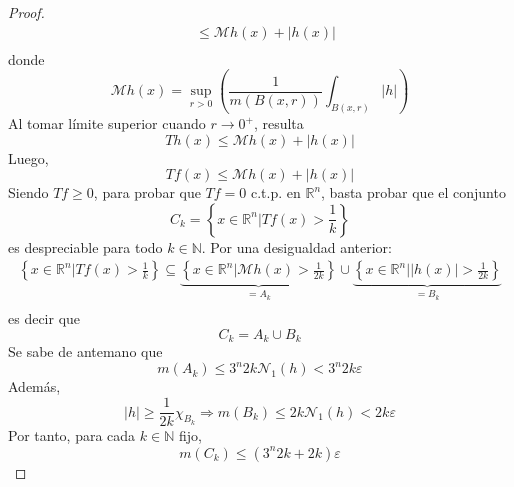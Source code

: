 \documentclass[12pt]{report}
\newcounter{it}
\theoremstyle{largebreak}
\renewcommand{\leq}{\ensuremath{\leqslant}}
\renewcommand{\geq}{\ensuremath{\geqslant}}
\newcommand\abs[1]{\ensuremath{\left|#1\right|}}
\newcommand{\N}[2]{\ensuremath{\mathcal{N}_{#1}\left(#2\right)}}
\begin{document}
\begin{proof}
\begin{equation*}
\begin{split}
                &\leq\mathcal{M}h(x)+\abs{h(x)}\\
            \end{split}
        \end{equation*}
        donde
        \begin{equation*}
            \mathcal{M}h(x)=\sup_{ r>0}\left(\frac{1}{m(B(x,r))}\int_{B(x,r)}\abs{h}\right)
        \end{equation*}
        Al tomar límite superior cuando $r\rightarrow0^+$, resulta
        \begin{equation*}
            Th(x)\leq\mathcal{M}h(x)+\abs{h(x)}
        \end{equation*}
        Luego,
        \begin{equation*}
            Tf(x)\leq\mathcal{M}h(x)+\abs{h(x)}
        \end{equation*}
        Siendo $Tf\geq0$, para probar que $Tf=0$ c.t.p. en $\mathbb{R}^n$, basta probar que el conjunto
        \begin{equation*}
            C_k=\left\{x\in\mathbb{R}^n\Big|Tf(x)>\frac{1}{k} \right\}
        \end{equation*}
        es despreciable para todo $k\in\mathbb{N}$. Por una desigualdad anterior:
        \begin{equation*}
            \begin{split}
                \left\{x\in\mathbb{R}^n\Big|Tf(x)>\frac{1}{k} \right\}\subseteq\underbrace{\left\{x\in\mathbb{R}^n\Big|\mathcal{M}h(x)>\frac{1}{2k} \right\}}_{ =A_k} \cup\underbrace{\left\{x\in\mathbb{R}^n\Big|\abs{h(x)}>\frac{1}{2k}\right\}}_{=B_k}\\
            \end{split}
        \end{equation*}
        es decir que
        \begin{equation*}
            C_k=A_k\cup B_k
        \end{equation*}
        Se sabe de antemano que
        \begin{equation*}
            m(A_k)\leq 3^n2k\N{1}{h}<3^n2k\varepsilon
        \end{equation*}
        Además,
        \begin{equation*}
            \abs{h}\geq\frac{1}{2k}\chi_{B_k}\Rightarrow m(B_k)\leq 2k\N{1}{h}<2k\varepsilon
        \end{equation*}
        Por tanto, para cada $k\in\mathbb{N}$ fijo,
        \begin{equation*}
            m(C_k)\leq (3^n2k+2k)\varepsilon

\end{equation*}
\end{proof}
\end{document}
